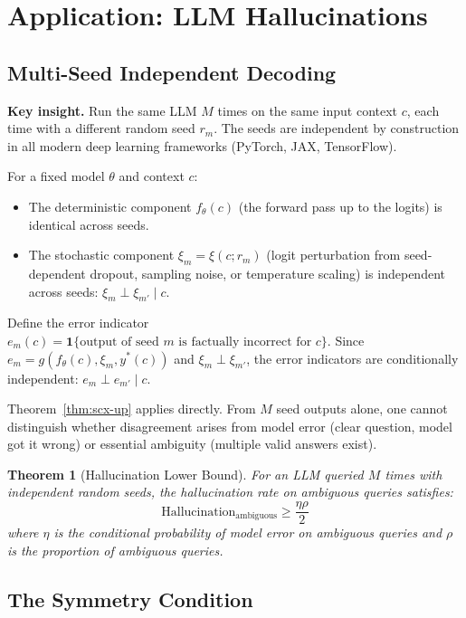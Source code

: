 \documentclass[12pt,a4paper]{ctexart}
\newtheorem{theorem}{Theorem}[section]
\theoremstyle{definition}
\theoremstyle{remark}
\begin{document}
\section{Application: LLM Hallucinations}

\subsection{Multi-Seed Independent Decoding}

\textbf{Key insight.} Run the same LLM $M$ times on the same input context $c$, each time with a different random seed $r_m$. The seeds are independent by construction in all modern deep learning frameworks (PyTorch, JAX, TensorFlow).

For a fixed model $\theta$ and context $c$:
\begin{itemize}
\item The deterministic component $f_\theta(c)$ (the forward pass up to the logits) is identical across seeds.
\item The stochastic component $\xi_m = \xi(c; r_m)$ (logit perturbation from seed-dependent dropout, sampling noise, or temperature scaling) is independent across seeds: $\xi_m \perp \xi_{m'} \mid c$.
\end{itemize}

Define the error indicator $e_m(c) = \mathbf{1}\{\text{output of seed } m \text{ is factually incorrect for } c\}$. Since $e_m = g(f_\theta(c), \xi_m, y^*(c))$ and $\xi_m \perp \xi_{m'}$, the error indicators are conditionally independent: $e_m \perp e_{m'} \mid c$.

Theorem~\ref{thm:scx-up} applies directly. From $M$ seed outputs alone, one cannot distinguish whether disagreement arises from model error (clear question, model got it wrong) or essential ambiguity (multiple valid answers exist).

\begin{theorem}[Hallucination Lower Bound]
\label{thm:hallucination}
For an LLM queried $M$ times with independent random seeds, the hallucination rate on ambiguous queries satisfies:
\begin{equation}
\text{Hallucination}_{\text{ambiguous}} \geq \frac{\eta\rho}{2}
\end{equation}
where $\eta$ is the conditional probability of model error on ambiguous queries and $\rho$ is the proportion of ambiguous queries.
\end{theorem}

\subsection{The Symmetry Condition}
\end{document}
